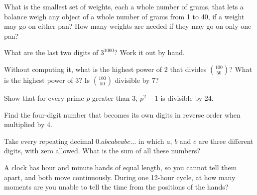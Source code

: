 \begin{question}\label{iq:iv1:number-riddles:13}
What is the smallest set of weights, each a whole number of grams, that lets a balance weigh any object of a whole number of grams from 1 to 40, if a weight may go on either pan? How many weights are needed if they may go on only one pan?
\end{question}

\begin{question}\label{iq:iv1:number-riddles:14}
What are the last two digits of $3^{1000}$? Work it out by hand.
\end{question}

\begin{question}\label{iq:iv1:number-riddles:15}
Without computing it, what is the highest power of 2 that divides $\binom{100}{50}$? What is the highest power of 3? Is $\binom{100}{50}$ divisible by 7?
\end{question}

\begin{question}\label{iq:iv1:number-riddles:16}
Show that for every prime $p$ greater than 3, $p^2 - 1$ is divisible by 24.
\end{question}

\begin{question}\label{iq:iv1:number-riddles:17}
Find the four-digit number that becomes its own digits in reverse order when multiplied by 4.
\end{question}

\begin{question}\label{iq:iv1:number-riddles:18}
Take every repeating decimal $0.abcabcabc\dots$ in which $a$, $b$ and $c$ are three different digits, with zero allowed. What is the sum of all these numbers?
\end{question}

\begin{question}\label{iq:iv1:number-riddles:19}
A clock has hour and minute hands of equal length, so you cannot tell them apart, and both move continuously. During one 12-hour cycle, at how many moments are you unable to tell the time from the positions of the hands?
\end{question}

